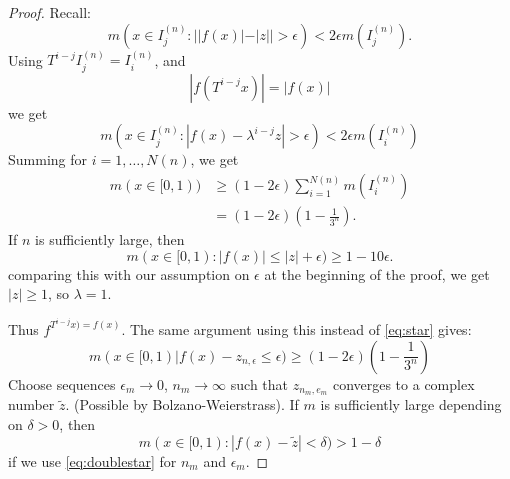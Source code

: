 \documentclass{article}
\begin{document}
\begin{proof}
  Recall:
  \begin{equation*}
    m(x \in I_j^{(n)} : ||f(x)| - |z|| > \epsilon) < 2 \epsilon m (I_j^{(n)}).
  \end{equation*}
  Using $T^{i-j} I_j^{(n)} = I_i^{(n)}$, and
  \begin{equation*}
    |f(T^{i-j} x)| = |f(x)| \tag{$*$}\label{eq:star}
  \end{equation*}
  we get
  \begin{equation*}
    m(x\in I_j^{(n)} : |f(x) - \lambda^{i-j} z| > \epsilon) < 2 \epsilon m(I_i^{(n)})
  \end{equation*}
  Summing for $i=1,\dotsc,N(n)$, we get
  \begin{align*}
    m(x \in [0,1)) &\geq (1 - 2 \epsilon) \sum_{i=1}^{N(n)} m(I_i^{(n)}) \\
                   &= (1 - 2\epsilon) (1 - \frac{1}{3^n}).
  \end{align*}
  If $n$ is sufficiently large, then
  \begin{equation*}
    m(x \in [0,1) : |f(x)| \leq |z| + \epsilon) \geq 1 - 10\epsilon.
  \end{equation*}
  comparing this with our assumption on $\epsilon$ at the beginning of the proof, we get $|z| \geq 1$, so $\lambda = 1$.

  Thus $f^{T^{i-j} x) = f(x)}$. The same argument using this instead of \eqref{eq:star} gives:
  \begin{equation*}
    m(x \in [0,1) | f(x) - z_{n,\epsilon} \leq \epsilon) \geq (1 - 2\epsilon) (1 - \frac{1}{3^n}) \label{eq:doublestar}\tag{$**$}
  \end{equation*}
  Choose sequences $\epsilon_m \to 0$, $n_m \to \infty$ such that $z_{n_m,e_m}$ converges to a complex number $\tilde{z}$.
  (Possible by Bolzano-Weierstrass).
  If $m$ is sufficiently large depending on $\delta > 0$, then
  \begin{equation*}
    m(x \in [0,1) : |f(x) - \tilde{z}| < \delta) > 1 - \delta
  \end{equation*}
  if we use \eqref{eq:doublestar} for $n_m$ and $\epsilon_m$.
\end{proof}

\clearpage
\color{black}
\end{document}
